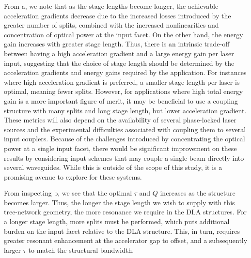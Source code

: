 
From a, we note that as the stage lengths become longer, the achievable acceleration gradients decrease due to the increased losses introduced by the greater number of splits, combined with the increased nonlinearities and concentration of optical power at the input facet. On the other hand, the energy gain increases with greater stage length. Thus, there is an intrinsic trade-off between having a high acceleration gradient and a large energy gain per laser input, suggesting that the choice of stage length should be determined by the acceleration gradients and energy gains required by the application. For instances where high acceleration gradient is preferred, a smaller stage length per laser is optimal, meaning fewer splits. However, for applications where high total energy gain is a more important figure of merit, it may be beneficial to use a coupling structure with many splits and long stage length, but lower acceleration gradient.  These metrics will also depend on the availability of several phase-locked laser sources and the experimental difficulties associated with coupling them to several input couplers.  Because of the challenges introduced by concentrating the optical power at a single input facet, there would be significant improvement on these results by considering input schemes that may couple a single beam directly into several waveguides.  While this is outside of the scope of this study, it is a promising avenue to explore for these systems.

From inspecting b, we see that the optimal $\tau$ and $Q$ increases as the structure becomes larger. Thus, the longer the stage length we wish to supply with this tree-network geometry, the more resonance we require in the DLA structures. For a longer stage length, more splits must be performed, which puts additional burden on the input facet relative to the DLA structure. This, in turn, requires greater resonant enhancement at the accelerator gap to offset, and a subsequently larger $\tau$ to match the structural bandwidth.

